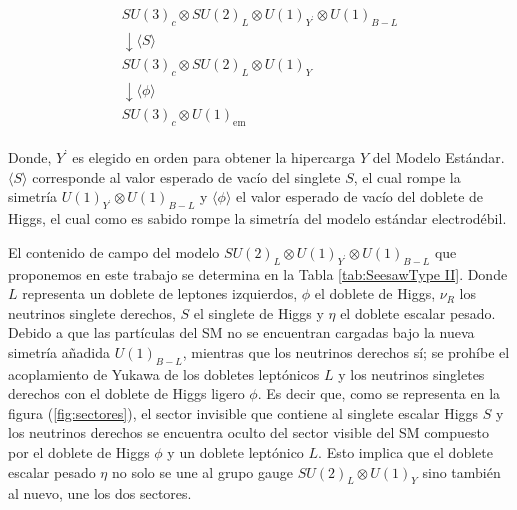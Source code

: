 \documentclass[12pt]{article}
\begin{document}
\begin{equation}
\begin{aligned}
 SU(3)_c \otimes SU(2)_L \otimes U(1)_{Y^ \text{'}} \otimes U(1)_{B-L}  \\
    \downarrow \langle S \rangle  \\
    SU(3)_c \otimes SU(2)_L \otimes U(1)_{Y} \\
     \downarrow \langle \phi \rangle  \\
     SU(3)_c \otimes  U(1)_{\text{em}}
\end{aligned}
\end{equation}\\

Donde, $Y^ \text{'} $ es elegido en orden para obtener la hipercarga $Y$ del Modelo Estándar.  $\langle S \rangle $ corresponde al valor esperado de vacío del singlete $S$, el cual rompe la simetría $U(1)_{Y^ \text{'}} \otimes U(1)_{B-L}$  y $\langle \phi \rangle$ el valor esperado de vacío del doblete de Higgs, el cual como es sabido rompe la simetría del modelo estándar electrodébil.  


El contenido de campo del modelo $SU(2)_L\otimes U(1)_{Y^ \text{'}} \otimes U(1)_{B-L} $ que proponemos en este trabajo se determina en la Tabla \ref{tab:SeesawType II}. Donde $L$ representa un doblete de leptones izquierdos, $\phi$ el doblete de Higgs, $\nu_R$ los neutrinos singlete derechos, $S$ el singlete de Higgs y $\eta$ el doblete escalar pesado. Debido a que las partículas del SM no se encuentran cargadas bajo la nueva simetría añadida $U(1)_{B-L}$, mientras que los neutrinos derechos sí; se prohíbe el acoplamiento de Yukawa de los dobletes leptónicos $L$ y los neutrinos singletes derechos con el doblete de Higgs ligero $\phi$. Es decir que, como se representa en la figura (\ref{fig:sectores}), el sector invisible que contiene al singlete escalar Higgs $S$ y los neutrinos derechos se encuentra oculto del sector visible del SM compuesto por el doblete de Higgs $\phi$ y un doblete leptónico $L$. Esto implica que el doblete escalar pesado $\eta$ no solo se une al grupo gauge $SU(2)_L \otimes U(1)_Y$ sino también al nuevo, une los dos sectores.\cite{Hong}  
\end{document}
